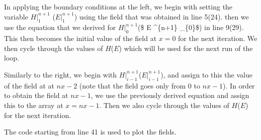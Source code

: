 \documentclass{article}
\begin{document}
In applying the boundary conditions at the left, we begin with setting
the variable \(H \Big |^{n+1} _{1}\) (\(E \Big |^{n+1} _{1}\)) using the
field that was obtained in line 5(24). then we use the equation that we
derived for \(H \Big |^{n+1} _{0}\)(\$ E \Big \textbar{}\^{}\{n+1\}
\_\{0\}\$) in line 9(29). This then becomes the initial value of the
field at \(x=0\) for the next iteration. We then cycle through the
values of \(H\)(\(E\)) which will be used for the next run of the loop.

Similarly to the right, we begin with
\(H \Big |^{n+1} _{i-1}\)(\(E \Big |^{n+1} _{i-1}\)), and assign to this
the value of the field at at \(nx-2\) (note that the field goes only
from \(0\) to \(nx-1\)). In order to obtain the field at \(nx-1\), we
use the previously derived equation and assign this to the array at
\(x=nx-1\). Then we also cycle through the values of \(H\)(\(E\)) for
the next iteration.

The code starting from line 41 is used to plot the fields.
\end{document}
